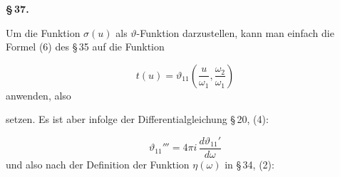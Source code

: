 \begin{center}
\textbf{\S\,37. }
\end{center}

Um die Funktion $\sigma(u)$ als $\vartheta$-Funktion darzustellen, kann man einfach die Formel (6) des \S\,35 auf die Funktion

\[
t(u) = \vartheta_{11}\left(\frac{u}{\omega_1}, \frac{\omega_2}{\omega_1}\right)
\]
anwenden, also

setzen. Es ist aber infolge der Differentialgleichung \S\,20, (4):

\[
\vartheta_{11}''' = 4\pi i\, \frac{d\vartheta_{11}'}{d\omega}
\]
und also nach der Definition der Funktion $\eta(\omega)$ in \S\,34, (2):

